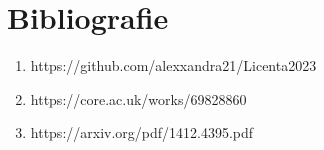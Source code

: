 \chapter*{Bibliografie} 

\begin{enumerate}
	\item https://github.com/alexxandra21/Licenta2023
	\item https://core.ac.uk/works/69828860
	\item https://arxiv.org/pdf/1412.4395.pdf
\end{enumerate}